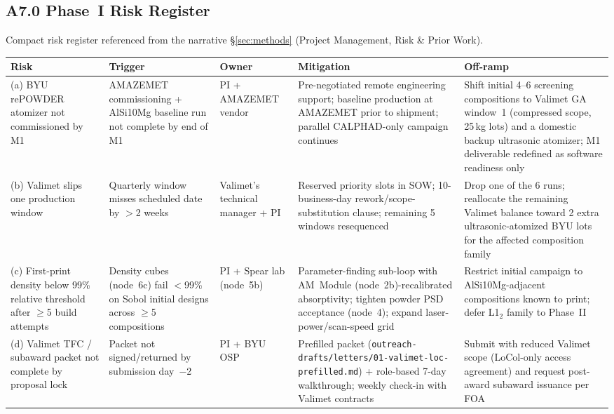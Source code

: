 \documentclass[11pt,letterpaper]{article}
\begin{document}
\subsection*{A7.0 Phase~I Risk Register}
\label{app:risk-register}
Compact risk register referenced from the narrative \S\ref{sec:methods}
(Project Management, Risk \& Prior Work).
\begin{table}[H]
\centering\scriptsize
\setlength{\tabcolsep}{3pt}
\begin{tabularx}{\textwidth}{@{}p{}p{}p{}XX@{}}
\toprule
\textbf{Risk} & \textbf{Trigger} & \textbf{Owner} & \textbf{Mitigation} & \textbf{Off-ramp} \\
\midrule
(a) BYU rePOWDER atomizer not commissioned by M1 & AMAZEMET commissioning + AlSi10Mg baseline run not complete by end of M1 & PI + AMAZEMET vendor & Pre-negotiated remote engineering support; baseline production at AMAZEMET prior to shipment; parallel CALPHAD-only campaign continues & Shift initial 4--6 screening compositions to Valimet GA window~1 (compressed scope, 25\,kg lots) and a domestic backup ultrasonic atomizer; M1 deliverable redefined as software readiness only \\
\addlinespace[2pt]
(b) Valimet slips one production window & Quarterly window misses scheduled date by $>$2 weeks & Valimet's technical manager + PI & Reserved priority slots in SOW; 10-business-day rework/scope-substitution clause; remaining 5 windows resequenced & Drop one of the 6 runs; reallocate the remaining Valimet balance toward 2 extra ultrasonic-atomized BYU lots for the affected composition family \\
\addlinespace[2pt]
(c) First-print density below 99\% relative threshold after $\geq$5 build attempts & Density cubes (node~6c) fail $<$99\% on Sobol initial designs across $\geq$5 compositions & PI + Spear lab (node~5b) & Parameter-finding sub-loop with AM~Module (node~2b)-recalibrated absorptivity; tighten powder PSD acceptance (node~4); expand laser-power/scan-speed grid & Restrict initial campaign to AlSi10Mg-adjacent compositions known to print; defer L1$_2$ family to Phase~II \\
\addlinespace[2pt]
(d) Valimet TFC / subaward packet not complete by proposal lock & Packet not signed/returned by submission day~$-$2 & PI + BYU OSP & Prefilled packet (\texttt{outreach-drafts/letters/01-valimet-loc-prefilled.md}) + role-based 7-day walkthrough; weekly check-in with Valimet contracts & Submit with reduced Valimet scope (LoCol-only access agreement) and request post-award subaward issuance per FOA \\

\end{tabularx}
\end{table}
\end{document}
